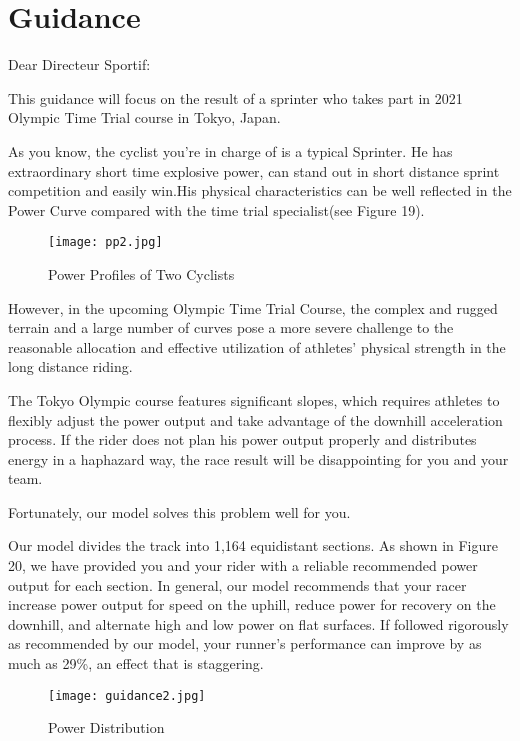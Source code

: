 \documentclass{mcmthesis}
\begin{document}
\section{Guidance}

\begin{letter}{Dear Directeur Sportif: }
	
	
	\vspace{\parskip}
	
	
	This guidance will focus on the result of a sprinter who takes part in 2021 Olympic Time Trial course in Tokyo, Japan.
	
	
	As you know, the cyclist you're in charge of is a typical Sprinter. He has extraordinary short time explosive power, can stand out in short distance sprint competition and easily win.His physical characteristics can be well reflected in the Power Curve compared with the time trial specialist(see Figure 19).
	
	\begin{figure}[h]
		\small
		\centering
		\texttt{[image: pp2.jpg]}
		\caption{Power Profiles of Two Cyclists} 
	\end{figure}
	
	However, in the upcoming Olympic Time Trial Course, the complex and rugged terrain and a large number of curves pose a more severe challenge to the reasonable allocation and effective utilization of athletes' physical strength in the long distance riding.
	
	The Tokyo Olympic course features significant slopes, which requires athletes to flexibly adjust the power output and take advantage of the downhill acceleration process. If the rider does not plan his power output properly and distributes energy in a haphazard way, the race result will be disappointing for you and your team.
	
	Fortunately, our model solves this problem well for you.
	
	Our model divides the track into 1,164 equidistant sections. As shown in Figure 20, we have provided you and your rider with a reliable recommended power output for each section. In general, our model recommends that your racer increase power output for speed on the uphill, reduce power for recovery on the downhill, and alternate high and low power on flat surfaces. If followed rigorously as recommended by our model, your runner's performance can improve by as much as 29\%, an effect that is staggering.
	
	\begin{figure}[h]
		\small
		\centering
		\texttt{[image: guidance2.jpg]}
		\caption{Power Distribution} 
	\end{figure}
	

\end{letter}
\end{document}
